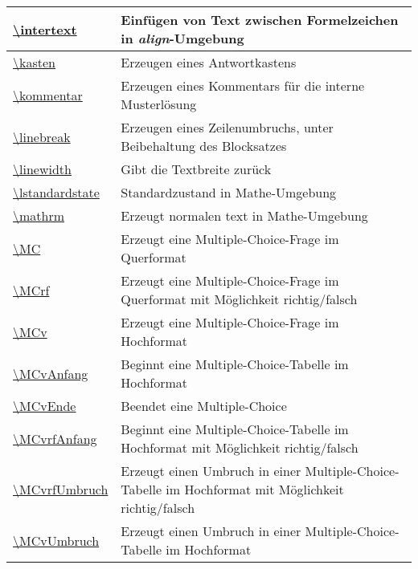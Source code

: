 \documentclass[./main.tex]{subfiles}
\begin{document}
\begin{tabularx}{\linewidth}{|l|X|}
    \hyperlink{intertext}{\textbackslash{}intertext}&Einf\"ugen von Text zwischen Formelzeichen in \textit{align}-Umgebung\\\hline
    \hyperlink{kasten}{\textbackslash{}kasten}&Erzeugen eines Antwortkastens\\\hline
    \hyperlink{kommentar}{\textbackslash{}kommentar}&Erzeugen eines Kommentars f\"ur die interne Musterl\"osung\\\hline
    \hyperlink{linebreak}{\textbackslash{}linebreak}&Erzeugen eines Zeilenumbruchs, unter Beibehaltung des Blocksatzes\\\hline
    \hyperlink{linewidth}{\textbackslash{}linewidth}&Gibt die Textbreite zur\"uck\\\hline
    \hyperlink{lstandardstate}{\textbackslash{}lstandardstate}&Standardzustand in Mathe-Umgebung\\\hline
    \hyperlink{mathrm}{\textbackslash{}mathrm}&Erzeugt normalen text in Mathe-Umgebung\\\hline
    \hyperlink{MC}{\textbackslash{}MC}&Erzeugt eine Multiple-Choice-Frage im Querformat\\\hline
    \hyperlink{MCrf}{\textbackslash{}MCrf}&Erzeugt eine Multiple-Choice-Frage im Querformat mit M\"oglichkeit richtig/falsch\\\hline
    \hyperlink{MCv}{\textbackslash{}MCv}&Erzeugt eine Multiple-Choice-Frage im Hochformat\\\hline
    \hyperlink{MCvAnfang}{\textbackslash{}MCvAnfang}&Beginnt eine Multiple-Choice-Tabelle im Hochformat\\\hline
    \hyperlink{MCvEnde}{\textbackslash{}MCvEnde}&Beendet eine Multiple-Choice\\\hline
    \hyperlink{MCvrfAnfang}{\textbackslash{}MCvrfAnfang}&Beginnt eine Multiple-Choice-Tabelle im Hochformat mit M\"oglichkeit richtig/falsch\\\hline
    \hyperlink{MCvrfUmbruch}{\textbackslash{}MCvrfUmbruch}&Erzeugt einen Umbruch in einer Multiple-Choice-Tabelle im Hochformat mit M\"oglichkeit richtig/falsch\\\hline
    \hyperlink{MCvUmbruch}{\textbackslash{}MCvUmbruch}&Erzeugt einen Umbruch in einer Multiple-Choice-Tabelle im Hochformat\\\hline

\end{tabularx}
\end{document}
